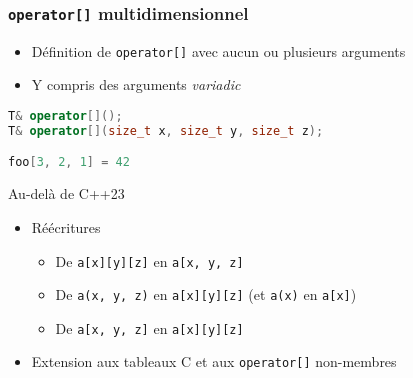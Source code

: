 \documentclass[C++.tex]{subfiles}
\begin{document}
\begin{frame}[fragile]
	\frametitle{\lstinline|operator[]| multidimensionnel}
	\begin{itemize}
		\item Définition de \lstinline|operator[]| avec aucun ou plusieurs arguments
		\item Y compris des arguments \textit{variadic}
	\end{itemize}

	\begin{lstlisting}[language=C++]
T& operator[]();
T& operator[](size_t x, size_t y, size_t z);

foo[3, 2, 1] = 42\end{lstlisting}


	\begin{block}{Au-delà de C++23}
		\begin{itemize}
			\item Réécritures
			\begin{itemize}
				\item De \lstinline|a[x][y][z]| en \lstinline|a[x, y, z]|
				\item De \lstinline|a(x, y, z)| en \lstinline|a[x][y][z]| (et  \lstinline|a(x)| en \lstinline|a[x]|)
				\item De \lstinline|a[x, y, z]| en \lstinline|a[x][y][z]|
			\end{itemize}
			\item Extension aux tableaux C et aux \lstinline|operator[]| non-membres
		\end{itemize}
	\end{block}


\end{frame}
\end{document}
